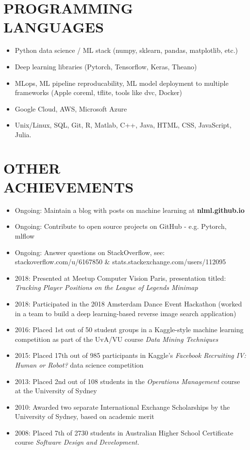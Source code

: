 \documentclass[margin]{res}
\begin{document}
\begin{resume}
		\section{PROGRAMMING\\LANGUAGES}
		\begin{itemize}
			\item Python data science / ML stack (numpy, sklearn, pandas, matplotlib, etc.)
			\item Deep learning libraries (Pytorch, Tensorflow, Keras, Theano)
			\item MLops, ML pipeline reproducability, ML model deployment to multiple frameworks (Apple coreml, tflite, tools like dvc, Docker)
			\item Google Cloud, AWS, Microsoft Azure
			\item Unix/Linux, SQL, Git, R, Matlab, C++, Java, HTML, CSS, JavaScript, Julia.
		\end{itemize}
		
		\section{OTHER \\ ACHIEVEMENTS}
		
		\begin{itemize}
			\item Ongoing: Maintain a blog with posts on machine learning at \textbf{nlml.github.io}
			\item Ongoing: Contribute to open source projects on GitHub - e.g. Pytorch, mlflow
			\item Ongoing: Answer questions on StackOverflow, see:\\stackoverflow.com/u/6167850 \& stats.stackexchange.com/users/112095
			\item 2018: Presented at Meetup Computer Vision Paris, presentation titled:\\ \emph{Tracking Player Positions on the League of Legends Minimap}
			\item 2018: Participated in the 2018 Amsterdam Dance Event Hackathon (worked in a team to build a deep learning-based reverse image search application)
			\item 2016: Placed 1st out of 50 student groups in a Kaggle-style machine learning competition as part of the UvA/VU course \textit{Data Mining Techniques}
			\item 2015: Placed 17th out of 985 participants in Kaggle's {\sl Facebook Recruiting IV: Human or Robot?} data science competition
			\item 2013: Placed 2nd out of 108 students in the \textit{Operations Management} course at the University of Sydney
			\item 2010: Awarded two separate International Exchange Scholarships by the University of Sydney, based on academic merit
			\item 2008: Placed 7th of 2730 students in Australian Higher School Certificate course {\sl Software Design and Development.}
		\end{itemize}
		
	\end{resume}
	
\end{document}
